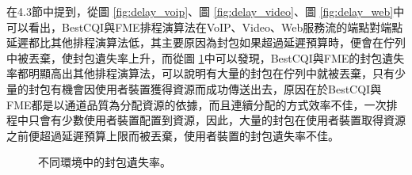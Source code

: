 在4.3節中提到，從圖 \ref{fig:delay_voip}、圖 \ref{fig:delay_video}、圖 \ref{fig:delay_web}中可以看出，BestCQI與FME排程演算法在VoIP、Video、Web服務流的端點對端點延遲都比其他排程演算法低，其主要原因為封包如果超過延遲預算時，便會在佇列中被丟棄，使封包遺失率上升，而從圖 \ref{fig:PLR}中可以發現，BestCQI與FME的封包遺失率都明顯高出其他排程演算法，可以說明有大量的封包在佇列中就被丟棄，只有少量的封包有機會因使用者裝置獲得資源而成功傳送出去，原因在於BestCQI與FME都是以通道品質為分配資源的依據，而且連續分配的方式效率不佳，一次排程中只會有少數使用者裝置配置到資源，因此，大量的封包在使用者裝置取得資源之前便超過延遲預算上限而被丟棄，使用者裝置的封包遺失率不佳。
\begin{figure}[H]
\centering
{}
\caption{\label{fig:PLR}不同環境中的封包遺失率。}
\end{figure}
